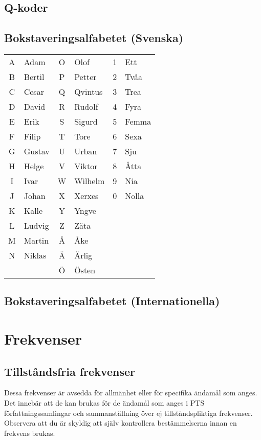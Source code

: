\documentclass[12pt,swedish,a4paper]{article}
\begin{document}
\subsection{Q-koder}

\subsection{Bokstaveringsalfabetet (Svenska)}

\begin{tabular}{cl|cl|cl }
	A & Adam   & O & Olof    & 1 & Ett \\
	B & Bertil & P & Petter  & 2 & Tvåa \\
	C & Cesar  & Q & Qvintus & 3 & Trea \\
	D & David  & R & Rudolf  & 4 & Fyra \\
	E & Erik   & S & Sigurd  & 5 & Femma \\
	F & Filip  & T & Tore    & 6 & Sexa \\
	G & Gustav & U & Urban   & 7 & Sju \\
	H & Helge  & V & Viktor  & 8 & Åtta \\
	I & Ivar   & W & Wilhelm & 9 & Nia \\
	J & Johan  & X & Xerxes  & 0 & Nolla \\
	K & Kalle  & Y & Yngve   &   &  \\
	L & Ludvig & Z & Zäta    &   &  \\
	M & Martin & Å & Åke     &   &  \\
	N & Niklas & Ä & Ärlig   &   &  \\
	  &        & Ö & Östen   &   &
\end{tabular}


\subsection{Bokstaveringsalfabetet (Internationella)}

\section{Frekvenser}

\subsection{Tillståndsfria frekvenser}

Dessa frekvenser är avsedda för allmänhet eller för specifika ändamål som anges. Det innebär att de kan brukas för de ändamål som anges i PTS författningssamlingar och sammanställning över ej tillståndspliktiga frekvenser. Observera att du är skyldig att själv kontrollera bestämmelserna innan en frekvens brukas.
\end{document}
